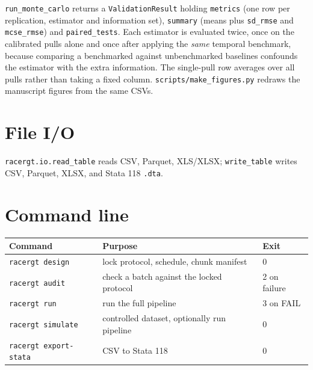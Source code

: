 \documentclass[12pt,a4paper,oneside]{article}
\begin{document}
\texttt{run\_monte\_carlo} returns a \texttt{ValidationResult} holding
\texttt{metrics} (one row per replication, estimator and information set),
\texttt{summary} (means plus \texttt{sd\_rmse} and \texttt{mcse\_rmse}) and
\texttt{paired\_tests}. Each estimator is evaluated twice, once on the calibrated
pulls alone and once after applying the \emph{same} temporal benchmark, because
comparing a benchmarked \RACER{} against unbenchmarked baselines confounds the
estimator with the extra information. The single-pull row averages over all
pulls rather than taking a fixed column. \texttt{scripts/make\_figures.py}
redraws the manuscript figures from the same CSVs.

\section{File I/O}

\texttt{racergt.io.read\_table} reads CSV, Parquet, XLS/XLSX;
\texttt{write\_table} writes CSV, Parquet, XLSX, and Stata 118 \texttt{.dta}.

\section{Command line}

\begin{table}[H]
\centering\small
\begin{tabularx}{\textwidth}{lXl}
\toprule
Command & Purpose & Exit\\
\midrule
\texttt{racergt design} & lock protocol, schedule, chunk manifest & 0\\
\texttt{racergt audit} & check a batch against the locked protocol & 2 on failure\\
\texttt{racergt run} & run the full pipeline & 3 on FAIL\\
\texttt{racergt simulate} & controlled dataset, optionally run pipeline & 0\\
\texttt{racergt export-stata} & CSV to Stata 118 & 0\\
\bottomrule
\end{tabularx}
\end{table}
\end{document}
